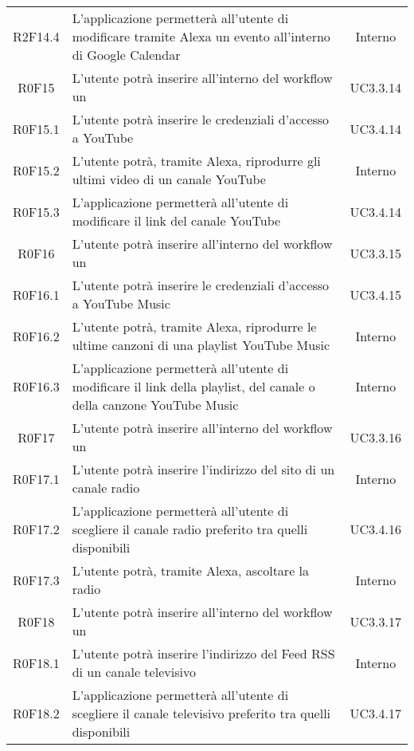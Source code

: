 \begin{center}
\begin{longtable}{cm{8cm}c }
	R2F14.4 & L'applicazione permetterà all'utente di modificare tramite Alexa un evento all'interno di Google Calendar & Interno \\
	R0F15 & L'utente potrà inserire all'interno del workflow un \BYouTube{} & UC3.3.14 \\
	R0F15.1 & L'utente potrà inserire le credenziali d'accesso a YouTube & UC3.4.14 \\
	R0F15.2 & L'utente potrà, tramite Alexa, riprodurre gli ultimi video di un canale YouTube  & Interno \\
	R0F15.3 & L'applicazione permetterà all'utente di modificare il link del canale YouTube & UC3.4.14 \\
	R0F16 & L'utente potrà inserire all'interno del workflow un \BYouTubeMusic{} & UC3.3.15 \\
	R0F16.1 & L'utente potrà inserire le credenziali d'accesso a YouTube Music & UC3.4.15 \\
	R0F16.2 & L'utente potrà, tramite Alexa, riprodurre le ultime canzoni di una playlist YouTube Music  & Interno \\
	R0F16.3 & L'applicazione permetterà all'utente di modificare il link della playlist, del canale o della canzone YouTube Music & Interno \\
	R0F17 & L'utente potrà inserire all'interno del workflow un \BRadio{} & UC3.3.16 \\
	R0F17.1 & L'utente potrà inserire l'indirizzo del sito di un canale radio  & Interno \\
	R0F17.2 & L'applicazione permetterà all'utente di scegliere il canale radio preferito tra quelli disponibili & UC3.4.16 \\
	R0F17.3 & L'utente potrà, tramite Alexa, ascoltare la radio & Interno \\
	R0F18 & L'utente potrà inserire all'interno del workflow un \BTV & UC3.3.17 \\
	R0F18.1 & L'utente potrà inserire l'indirizzo del Feed RSS di un canale televisivo  & Interno \\
	R0F18.2 & L'applicazione permetterà all'utente di scegliere il canale televisivo preferito tra quelli disponibili & UC3.4.17 \\

\end{longtable}
\end{center}
